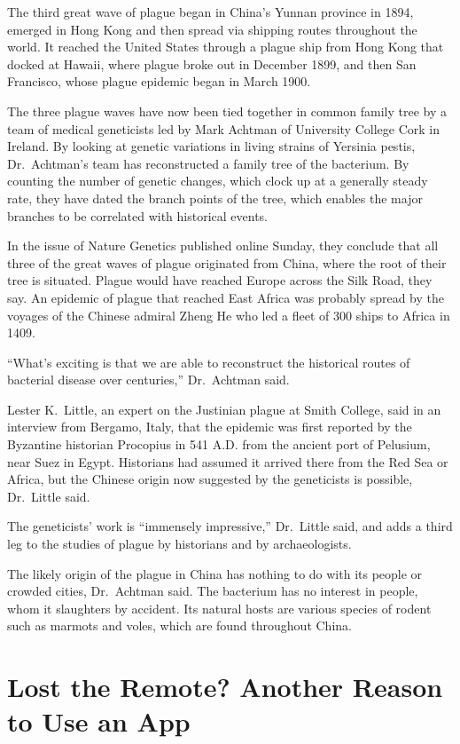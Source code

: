 ﻿\documentclass[12pt]{article}
\begin{document}
The third great wave of plague began in China's Yunnan province in 1894, emerged in Hong Kong and
then spread via shipping routes throughout the world. It reached the United States through a plague
ship from Hong Kong that docked at Hawaii, where plague broke out in December 1899, and then San
Francisco, whose plague epidemic began in March 1900.

The three plague waves have now been tied together in common family tree by a team of medical
geneticists led by Mark Achtman of University College Cork in Ireland. By looking at genetic
variations in living strains of Yersinia pestis, Dr.~Achtman's team has reconstructed a family tree
of the bacterium. By counting the number of genetic changes, which clock up at a generally steady
rate, they have dated the branch points of the tree, which enables the major branches to be
correlated with historical events.

In the issue of Nature Genetics published online Sunday, they conclude that all three of the great
waves of plague originated from China, where the root of their tree is situated. Plague would have
reached Europe across the Silk Road, they say. An epidemic of plague that reached East Africa was
probably spread by the voyages of the Chinese admiral Zheng He who led a fleet of 300 ships to
Africa in 1409.

``What's exciting is that we are able to reconstruct the historical routes of bacterial disease over
centuries,'' Dr.~Achtman said.

Lester K.~Little, an expert on the Justinian plague at Smith College, said in an interview from
Bergamo, Italy, that the epidemic was first reported by the Byzantine historian Procopius in 541
A.D. from the ancient port of Pelusium, near Suez in Egypt. Historians had assumed it arrived there
from the Red Sea or Africa, but the Chinese origin now suggested by the geneticists is possible,
Dr.~Little said.

The geneticists' work is ``immensely impressive,'' Dr.~Little said, and adds a third leg to the
studies of plague by historians and by archaeologists.

The likely origin of the plague in China has nothing to do with its people or crowded cities,
Dr.~Achtman said. The bacterium has no interest in people, whom it slaughters by accident. Its
natural hosts are various species of rodent such as marmots and voles, which are found throughout
China.


\section{Lost the Remote? Another Reason to Use an App}
\end{document}
